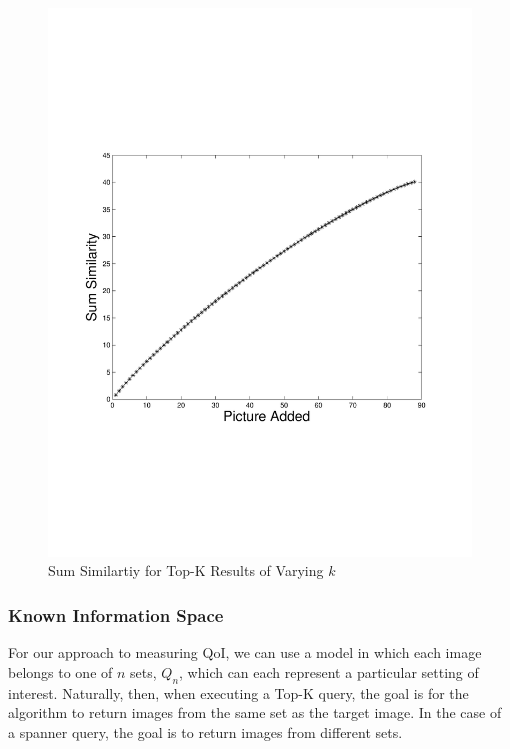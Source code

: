 
\begin{figure} 
\begin{centering}
    \includegraphics[trim = 0mm 70mm 0mm 70mm, scale=0.40]{figures/topk/topk_sum_sim.pdf}
    \caption{Sum Similartiy for Top-K Results of Varying $k$}
    \label{fig:topkSumSim}
\end{centering}
\end{figure}

\subsubsection{Known Information Space}
For our approach to measuring QoI, we can use a model in which each image belongs to one of $n$ sets, $Q_n$, which can each represent a particular setting of interest.  Naturally, then, when executing a Top-K query, the goal is for the algorithm to return images from the same set as the target image.  In the case of a spanner query, the goal is to return images from different sets.  

